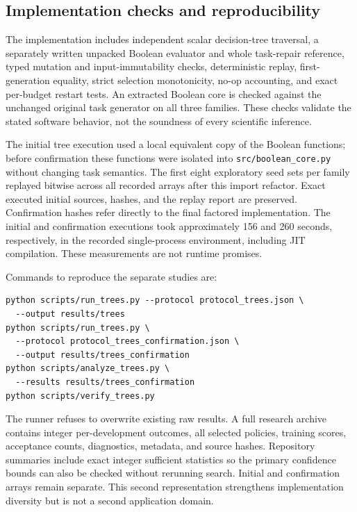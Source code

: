 \subsection{Implementation checks and reproducibility}
The implementation includes independent scalar decision-tree traversal, a separately written unpacked Boolean evaluator and whole task-repair reference, typed mutation and input-immutability checks, deterministic replay, first-generation equality, strict selection monotonicity, no-op accounting, and exact per-budget restart tests. An extracted Boolean core is checked against the unchanged original task generator on all three families. These checks validate the stated software behavior, not the soundness of every scientific inference.

The initial tree execution used a local equivalent copy of the Boolean functions; before confirmation these functions were isolated into \texttt{src/boolean\_core.py} without changing task semantics. The first eight exploratory seed sets per family replayed bitwise across all recorded arrays after this import refactor. Exact executed initial sources, hashes, and the replay report are preserved. Confirmation hashes refer directly to the final factored implementation. The initial and confirmation executions took approximately 156 and 260 seconds, respectively, in the recorded single-process environment, including JIT compilation. These measurements are not runtime promises.

Commands to reproduce the separate studies are:
\begin{verbatim}
python scripts/run_trees.py --protocol protocol_trees.json \
  --output results/trees
python scripts/run_trees.py \
  --protocol protocol_trees_confirmation.json \
  --output results/trees_confirmation
python scripts/analyze_trees.py \
  --results results/trees_confirmation
python scripts/verify_trees.py
\end{verbatim}
The runner refuses to overwrite existing raw results. A full research archive contains integer per-development outcomes, all selected policies, training scores, acceptance counts, diagnostics, metadata, and source hashes. Repository summaries include exact integer sufficient statistics so the primary confidence bounds can also be checked without rerunning search. Initial and confirmation arrays remain separate. This second representation strengthens implementation diversity but is not a second application domain.
